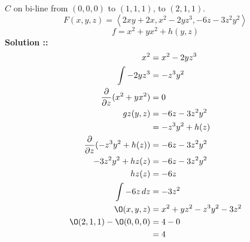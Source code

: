 \documentclass[11pt]{article}
\begin{document}
$C$ on bi-line from $(0,0,0)$ to $(1,1,1)$, to $(2,1,1)$.
$$F(x,y,z)=\left\langle2xy+2x, x^2-2yz^3, -6z-3z^2y^2\right\rangle$$
$$f = x^2 + yx^2 + h(y,z)$$
\vspace{5px}\textbf{Solution ::}
\begin{align}
    x^2 &= x^2-2yz^3 \\
    \int -2yz^3 &= -z^3y^2 \\
    \frac{\partial}{\partial z}(x^2 + yx^2) &= 0 \\
    gz(y,z)&= -6z-3z^2y^2 \\
    &= -z^3y^2 + h(z) \\
    \frac{\partial}{\partial z}(-z^3y^2 + h(z)) &= -6z-3z^2y^2 \\
    -3z^2y^2+hz(z) &= -6z-3z^2y^2 \\
    hz(z) &= -6z \\
    \int -6z\,dz &= -3z^2 \\
    \O (x,y,z) &= x^2+yz^2-z^3y^2-3z^2 \\
    \O (2,1,1) - \O (0,0,0)  &= 4 - 0 \\
    &= 4
\end{align}
\end{document}
